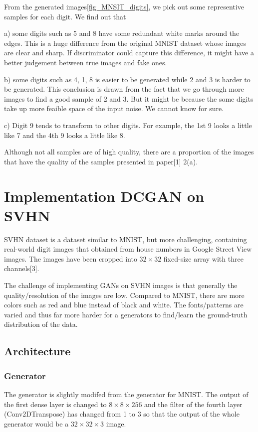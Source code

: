 \documentclass{article}
\begin{document}
From the generated images\ref{fig_MNSIT_digits}, we pick out some representive samples for each digit. We find out that 

a) some digits such as 5 and 8 have some redundant white marks around the edges. This is a huge difference from the original MNIST dataset whose images are clear and sharp. If discriminator could capture this difference, it might have a better judgement between true images and fake ones.

b) some digits such as 4, 1, 8 is easier to be generated while 2 and 3 is harder to be generated. This conclusion is drawn from the fact that we go through more images to find a good sample of 2 and 3. But it might be because the some digits take up more feaible space of the input noise. We cannot know for sure.

c) Digit 9 tends to transform to other digits. For example, the 1st 9 looks a little like 7 and the 4th 9 looks a little like 8.

Although not all samples are of high quality, there are a proportion of the images that have the quality of the samples presented in paper[1] 2(a).

\newpage
\section{Implementation DCGAN on SVHN}

SVHN dataset is a dataset similar to MNIST, but more challenging, containing real-world digit images that obtained from house numbers in Google Street View images. The images have been cropped into $32\times 32$ fixed-size array with three channels[3].

The challenge of implementing GANs on SVHN images is that generally the quality/resolution of the images are low. Compared to MNIST, there are more colors such as red and blue instead of black and white. The fonts/patterns are varied and thus far more harder for a generators to find/learn the ground-truth distribution of the data.

\subsection{Architecture}

\subsubsection{Generator}

The generator is slightly modifed from the generator for MNIST. 
The output of the first dense layer is changed to $8\times 8\times 256$ 
and the filter of the fourth layer (Conv2DTranspose) has changed from 1 to 3
so that the output of the whole generator would be a $32\times 32\times 3$ image.
\end{document}
